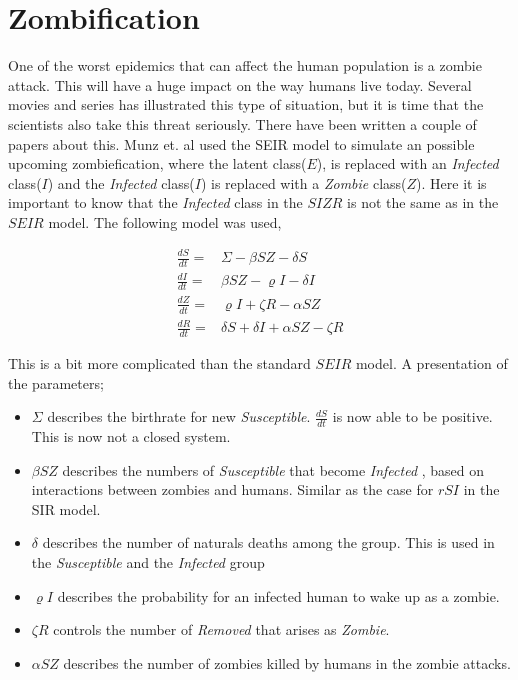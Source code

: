 \documentclass[%
twoside,                 %
final,                   %
10pt]{article}
\begin{document}
\section{Zombification}
One of the worst epidemics that can affect the human population is a zombie attack. This will have a huge impact on the way humans live today. Several movies and series has illustrated this type of situation, but it is time that the scientists also take this threat seriously. There have been written a couple of papers about this. Munz et. al\cite{munz2009zombies} used the SEIR model to simulate an possible upcoming zombiefication, where the latent class($E$), is replaced with an \emph{Infected} class($I$) and the \emph{Infected} class($I$) is replaced with a \emph{Zombie} class($Z$). Here it is important to know that the \emph{Infected} class in the $SIZR$ is not the same as in the $SEIR$ model. The following model was used,

\begin{align*}
\frac{dS}{dt} =& \Sigma -\beta SZ - \delta S \\
\frac{dI}{dt} =& \beta SZ - \varrho I - \delta I\\
\frac{dZ}{dt} =& \varrho I + \zeta R - \alpha SZ\\
\frac{dR}{dt} =& \delta S + \delta I + \alpha SZ - \zeta R
\end{align*}

This is a bit more complicated than the standard $SEIR$ model. A presentation of the parameters;
\begin{itemize}
\item $\Sigma$ describes the birthrate for new \emph{Susceptible}. $\frac{dS}{dt}$ is now able to be positive. This is now not a closed system. 

\item $\beta SZ$ describes the numbers of \emph{Susceptible} that become \emph{Infected} , based on interactions between zombies and humans. Similar as the case for $rSI$ in the SIR model. 

\item $\delta$ describes the number of naturals deaths among the group. This is used in the \emph{Susceptible} and the \emph{Infected} group

\item $\varrho I$ describes the probability for an infected human to wake up as a zombie.

\item $\zeta R$ controls the number of \emph{Removed} that arises as \emph{Zombie}. 

\item $\alpha SZ$ describes the number of zombies killed by humans in the zombie attacks. 
\end{itemize}
\end{document}
